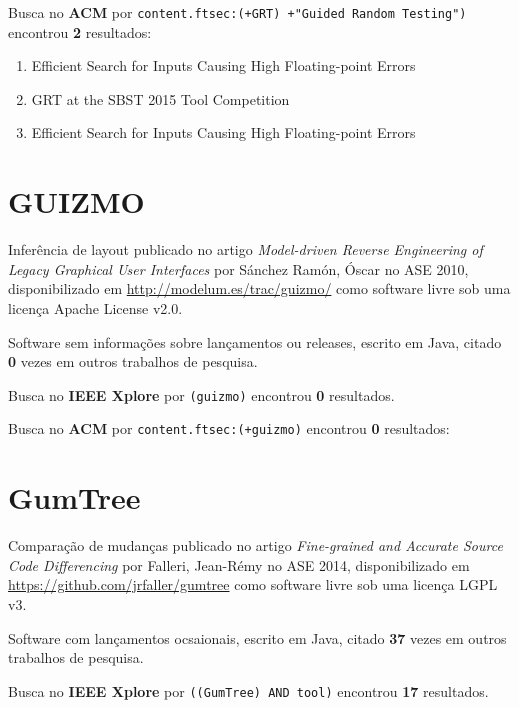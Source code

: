 Busca no {\bf ACM} por
\texttt{content.ftsec:(+GRT) +"Guided Random Testing")}
encontrou {\bf 2}
resultados:

\begin{enumerate}
\item Efficient Search for Inputs Causing High Floating-point Errors
\item GRT at the SBST 2015 Tool Competition
\item Efficient Search for Inputs Causing High Floating-point Errors
\end{enumerate}

\section{GUIZMO}

Inferência de layout
publicado no artigo {\it Model-driven Reverse Engineering of Legacy Graphical User Interfaces}
por S\'{a}nchez Ram\'{o}n, \'{O}scar
no ASE 2010,
disponibilizado em \url{http://modelum.es/trac/guizmo/}
como software livre
sob uma licença Apache License v2.0.

Software sem informações sobre lançamentos ou releases,
escrito em Java,
citado {\bf 0} vezes em outros trabalhos de pesquisa.

Busca no {\bf IEEE Xplore} por
\texttt{(guizmo)}
encontrou {\bf 0}
resultados.


Busca no {\bf ACM} por
\texttt{content.ftsec:(+guizmo)}
encontrou {\bf 0}
resultados:


\section{GumTree}

Comparação de mudanças
publicado no artigo {\it Fine-grained and Accurate Source Code Differencing}
por Falleri, Jean-R{\'e}my
no ASE 2014,
disponibilizado em \url{https://github.com/jrfaller/gumtree}
como software livre
sob uma licença LGPL v3.

Software com lançamentos ocsaionais,
escrito em Java,
citado {\bf 37} vezes em outros trabalhos de pesquisa.

Busca no {\bf IEEE Xplore} por
\texttt{((GumTree) AND tool)}
encontrou {\bf 17}
resultados.


